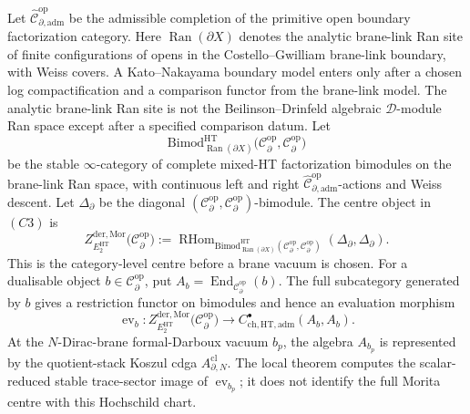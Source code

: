 \begin{defn}
\label{defn:typed-morita-centre-hochschild-chart}
Let \(\widehat{\mathcal C}^{\mathrm{op}}_{\partial,\mathrm{adm}}\)
be the admissible completion of the primitive open boundary
factorization category.  Here
\(\operatorname{Ran}(\partial X)\) denotes the analytic brane-link Ran
site of finite configurations of opens in the Costello--Gwilliam
brane-link boundary, with Weiss covers.  A Kato--Nakayama boundary model
enters only after a chosen log compactification and a comparison functor
from the brane-link model.  The analytic brane-link Ran site is not the
Beilinson--Drinfeld algebraic \(\mathcal D\)-module Ran space except
after a specified comparison datum.  Let
\[
  \mathrm{Bimod}^{\mathrm{HT}}_{\operatorname{Ran}(\partial X)}
  \bigl(\mathcal C^{\mathrm{op}}_\partial,
        \mathcal C^{\mathrm{op}}_\partial\bigr)
\]
be the stable \(\infty\)-category of complete mixed-HT factorization
bimodules on the brane-link Ran space, with continuous left and right
\(\widehat{\mathcal C}^{\mathrm{op}}_{\partial,\mathrm{adm}}\)-actions
and Weiss descent.  Let \(\Delta_\partial\) be the diagonal
\((\mathcal C^{\mathrm{op}}_\partial,
\mathcal C^{\mathrm{op}}_\partial)\)-bimodule.  The centre object in
\((C3)\) is
\[
  Z^{\mathrm{der},\mathrm{Mor}}_{E_2^{\mathrm{HT}}}
  \bigl(\mathcal C^{\mathrm{op}}_\partial\bigr)
  :=
  \operatorname{RHom}_{
  \mathrm{Bimod}^{\mathrm{HT}}_{\operatorname{Ran}(\partial X)}
  (\mathcal C^{\mathrm{op}}_\partial,
   \mathcal C^{\mathrm{op}}_\partial)}
  (\Delta_\partial,\Delta_\partial).
\]
This is the category-level centre before a brane vacuum is chosen.
For a dualisable object \(b\in\mathcal C^{\mathrm{op}}_\partial\), put
\(A_b=\operatorname{End}_{\mathcal C^{\mathrm{op}}_\partial}(b)\).  The
full subcategory generated by \(b\) gives a restriction functor on
bimodules and hence an evaluation morphism
\[
  \operatorname{ev}_b\colon
  Z^{\mathrm{der},\mathrm{Mor}}_{E_2^{\mathrm{HT}}}
  \bigl(\mathcal C^{\mathrm{op}}_\partial\bigr)
  \longrightarrow
  C^\bullet_{\mathrm{ch},\mathrm{HT},\mathrm{adm}}(A_b,A_b).
\]
At the \(N\)-Dirac-brane formal-Darboux vacuum \(b_p\), the algebra
\(A_{b_p}\) is represented by the quotient-stack Koszul cdga
\(A^{\mathrm{cl}}_{\partial,N}\).  The local theorem computes the
scalar-reduced stable trace-sector image of
\(\operatorname{ev}_{b_p}\); it does not identify the full Morita
centre with this Hochschild chart.
\end{defn}

